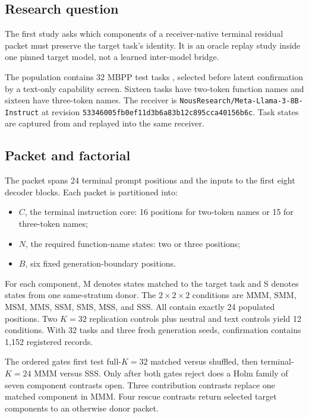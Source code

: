 \documentclass[11pt]{article}
\begin{document}
\subsection{Research question}

The first study asks which components of a receiver-native terminal residual packet must preserve the target task's identity. It is an oracle replay study inside one pinned target model, not a learned inter-model bridge.

The population contains 32 MBPP test tasks \cite{austin2021}, selected before latent confirmation by a text-only capability screen. Sixteen tasks have two-token function names and sixteen have three-token names. The receiver is \texttt{NousResearch/Meta-Llama-3-8B-Instruct} at revision \texttt{53346005fb0ef11d3b6a83b12c895cca40156b6c}. Task states are captured from and replayed into the same receiver.

\subsection{Packet and factorial}

The packet spans 24 terminal prompt positions and the inputs to the first eight decoder blocks. Each packet is partitioned into:

\begin{itemize}
  \item \(C\), the terminal instruction core: 16 positions for two-token names or 15 for three-token names;
  \item \(N\), the required function-name states: two or three positions;
  \item \(B\), six fixed generation-boundary positions.
\end{itemize}

For each component, M denotes states matched to the target task and S denotes states from one same-stratum donor. The \(2 \times 2 \times 2\) conditions are MMM, SMM, MSM, MMS, SSM, SMS, MSS, and SSS. All contain exactly 24 populated positions. Two \(K=32\) replication controls plus neutral and text controls yield 12 conditions. With 32 tasks and three fresh generation seeds, confirmation contains 1,152 registered records.

The ordered gates first test full-\(K=32\) matched versus shuffled, then terminal-\(K=24\) MMM versus SSS. Only after both gates reject does a Holm family of seven component contrasts open. Three contribution contrasts replace one matched component in MMM. Four rescue contrasts return selected target components to an otherwise donor packet.
\end{document}
